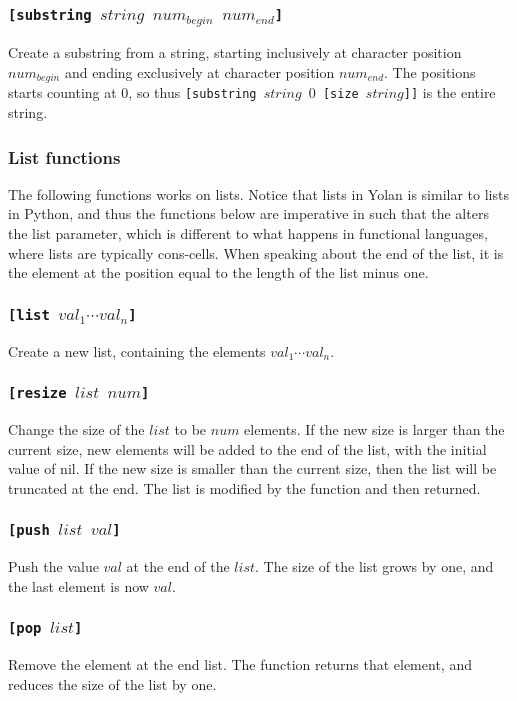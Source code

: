 \documentclass[11pt]{report}
\begin{document}
\subsubsection*{\tt{[substring }$string$ $num_{begin}$ $num_{end}$\tt{]}}
Create a substring from a string, starting inclusively at character position $num_{begin}$ and ending exclusively at character position $num_{end}$. The positions starts counting at $0$, so thus {\tt{[substring }$string$ $0$ \tt{[size }$string$\tt{]]}} is the entire string.

\subsubsection{List functions}
The following functions works on lists. Notice that lists in Yolan is similar to lists in Python, and thus the functions below are imperative in such that the alters the list parameter, which is different to what happens in functional languages, where lists are typically cons-cells. When speaking about the end of the list, it is the element at the position equal to the length of the list minus one.

\subsubsection*{\tt{[list }$val_1\cdots val_n$\tt{]}}
Create a new list, containing the elements $val_1\cdots val_n$.

\subsubsection*{\tt{[resize }$list$ $num$\tt{]}}
Change the size of the $list$ to be $num$ elements. 
If the new size is larger than the current size, new elements will be added to the end of the list, with the initial value of nil. If the new size is smaller than the current size, then the list will be truncated at the end. The list is modified by the function and then returned.

\subsubsection*{\tt{[push }$list$ $val$\tt{]}}
Push the value $val$ at the end of the $list$. The size of the list grows by one, and the last element is now $val$.

\subsubsection*{\tt{[pop }$list$\tt{]}}
Remove the element at the end list. The function returns that element, and reduces the size of the list by one.
\end{document}
